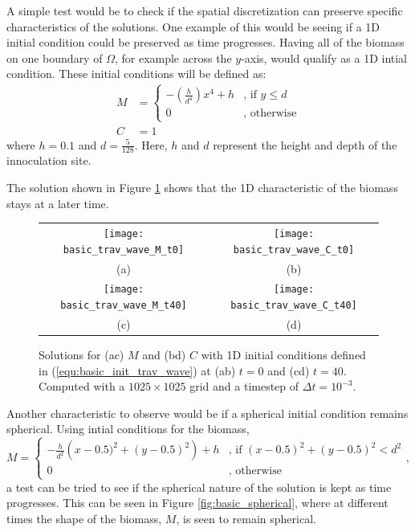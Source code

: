   A simple test would be to check if the spatial discretization can preserve specific characteristics of the solutions.
  One example of this would be seeing if a 1D initial condition could be preserved as time progresses.
  Having all of the biomass on one boundary of $\Omega$, for example across the $y$-axis, would qualify as a 1D intial condition.
  These initial conditions will be defined as:
  \begin{equation} \label{equ:basic_init_trav_wave}
    \begin{aligned}
    M &= \begin{cases}
      -\left( \frac{h}{d^4} \right) x^4 + h & \text{, if } y \le d \\
      0 & \text{, otherwise}
    \end{cases} \\
    C &= 1
    \end{aligned}
  \end{equation}
  where $h = 0.1$ and $d = \frac{5}{128}$.
  Here, $h$ and $d$ represent the height and depth of the innoculation site. 

  The solution shown in Figure \ref{fig:basic_trav} shows that the 1D characteristic of the biomass stays at a later time. 

  \begin{figure}
    \centering
    \begin{tabular}{c c}
      \texttt{[image: basic\_trav\_wave\_M\_t0]} & 
      \texttt{[image: basic\_trav\_wave\_C\_t0]} \\
      (a) & (b) \\
      \texttt{[image: basic\_trav\_wave\_M\_t40]} &
      \texttt{[image: basic\_trav\_wave\_C\_t40]}\\
      (c) & (d)
    \end{tabular}
    \caption{Solutions for (ac) $M$ and (bd) $C$ with 1D initial conditions defined in (\ref{equ:basic_init_trav_wave}) at (ab) $t = 0$ and (cd) $t = 40$. Computed with a $1025 \times 1025$ grid and a timestep of $\Delta t = 10^{-3}$.}
    \label{fig:basic_trav}
  \end{figure}

  Another characteristic to observe would be if a spherical initial condition remains spherical.
  Using intial conditions for the biomass,
  \begin{equation} \label{equ:basic_spherical}
    M = \begin{cases}
      - \frac{h}{d^2} \left( x - 0.5)^2 + (y - 0.5)^2 \right) + h  & \text{, if } (x - 0.5)^2 + (y - 0.5)^2 < d^2 \\
      0 & \text{, otherwise}
    \end{cases},
  \end{equation}
  a test can be tried to see if the spherical nature of the solution is kept as time progresses.
  This can be seen in Figure \ref{fig:basic_spherical}, where at different times the shape of the biomass, $M$, is seen to remain spherical.

